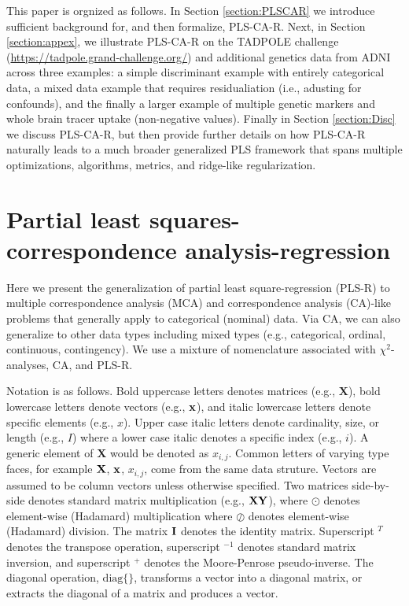 \documentclass[12pt]{article}
\begin{document}
This paper is orgnized as follows. In Section \ref{section:PLSCAR} we
introduce sufficient background for, and then formalize, PLS-CA-R. Next,
in Section \ref{section:appex}, we illustrate PLS-CA-R on the TADPOLE
challenge (\url{https://tadpole.grand-challenge.org/}) and additional
genetics data from ADNI across three examples: a simple discriminant
example with entirely categorical data, a mixed data example that
requires residualiation (i.e., adusting for confounds), and the finally
a larger example of multiple genetic markers and whole brain tracer
uptake (non-negative values). Finally in Section \ref{section:Disc} we
discuss PLS-CA-R, but then provide further details on how PLS-CA-R
naturally leads to a much broader generalized PLS framework that spans
multiple optimizations, algorithms, metrics, and ridge-like
regularization.

\hypertarget{partial-least-squares-correspondence-analysis-regression}{%
\section{Partial least squares-correspondence
analysis-regression}\label{partial-least-squares-correspondence-analysis-regression}}

\label{section:PLSCAR}

Here we present the generalization of partial least square-regression
(PLS-R) to multiple correspondence analysis (MCA) and correspondence
analysis (CA)-like problems that generally apply to categorical
(nominal) data. Via CA, we can also generalize to other data types
including mixed types (e.g., categorical, ordinal, continuous,
contingency). We use a mixture of nomenclature associated with
\(\chi^2\)-analyses, CA, and PLS-R.

Notation is as follows. Bold uppercase letters denotes matrices (e.g.,
\(\mathbf{X}\)), bold lowercase letters denote vectors (e.g.,
\(\bf{x}\)), and italic lowercase letters denote specific elements
(e.g., \(x\)). Upper case italic letters denote cardinality, size, or
length (e.g., \(I\)) where a lower case italic denotes a specific index
(e.g., \(i\)). A generic element of \(\mathbf{X}\) would be denoted as
\(x_{i,j}\). Common letters of varying type faces, for example
\({\bf X}\), \(\bf{x}\), \(x_{i,j}\), come from the same data struture.
Vectors are assumed to be column vectors unless otherwise specified. Two
matrices side-by-side denotes standard matrix multiplication (e.g.,
\(\bf{X}\bf{Y}\)), where \(\odot\) denotes element-wise (Hadamard)
multiplication where \(\oslash\) denotes element-wise (Hadamard)
division. The matrix \({\bf I}\) denotes the identity matrix.
Superscript \(^{T}\) denotes the transpose operation, superscript
\(^{-1}\) denotes standard matrix inversion, and superscript \(^{+}\)
denotes the Moore-Penrose pseudo-inverse. The diagonal operation,
\(\mathrm{diag\{\}}\), transforms a vector into a diagonal matrix, or
extracts the diagonal of a matrix and produces a vector.
\end{document}
